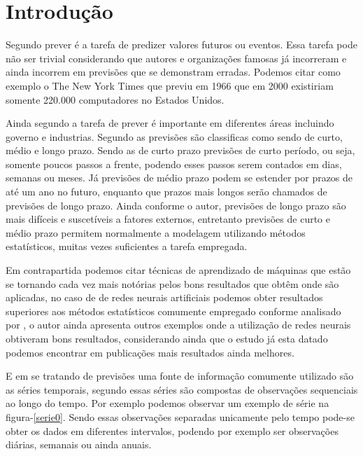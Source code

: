 \documentclass[
	12pt,
	oneside,
	a4paper,
	english,
	brazil
]{abntex2}
\begin{document}
\frenchspacing

\imprimircapa{}

\imprimirfolhaderosto{}

\textual{}

\tableofcontents*
\cleardoublepage{}

\chapter{Introdução}

Segundo  prever é a tarefa de predizer valores futuros ou 
eventos. Essa tarefa pode não ser trivial considerando que autores e 
organizações famosas já incorreram e ainda incorrem em previsões que se 
demonstram erradas.  Podemos citar como exemplo o The New York Times que previu 
em 1966 que em 2000 existiriam somente 220.000 computadores no Estados Unidos.

Ainda segundo  a tarefa de prever é importante em diferentes 
áreas incluindo governo e industrias. Segundo  as previsões 
são classificas como sendo de curto, médio e longo prazo.  Sendo as de curto 
prazo previsões de curto período, ou seja, somente poucos passos a frente, 
podendo esses passos serem contados em dias, semanas ou meses.  Já previsões de 
médio prazo podem se estender por prazos de até um ano no futuro, enquanto que 
prazos mais longos serão chamados de previsões de longo prazo. Ainda conforme o 
autor, previsões de longo prazo são mais difíceis e suscetíveis a fatores 
externos, entretanto previsões de curto e médio prazo permitem normalmente a 
modelagem utilizando métodos estatísticos, muitas vezes suficientes a tarefa 
empregada.

Em contrapartida podemos citar técnicas de aprendizado de máquinas que estão se 
tornando cada vez mais notórias pelos bons resultados que obtêm onde são 
aplicadas, no caso de de redes neurais artificiais podemos obter resultados 
superiores aos métodos estatísticos comumente empregado conforme analisado por 
, o autor ainda apresenta outros exemplos onde a utilização de 
redes neurais obtiveram bons resultados, considerando ainda que o estudo já esta 
datado podemos encontrar em publicações mais resultados ainda melhores.

E em se tratando de previsões uma fonte de informação comumente utilizado são as 
séries temporais, segundo  essas séries são compostas de 
observações sequenciais ao longo do tempo. Por exemplo podemos observar um 
exemplo de série na figura-\ref{serie0}. Sendo essas observações separadas 
unicamente pelo tempo pode-se obter os dados em diferentes intervalos, podendo 
por exemplo ser observações diárias, semanais ou ainda anuais.
\end{document}
